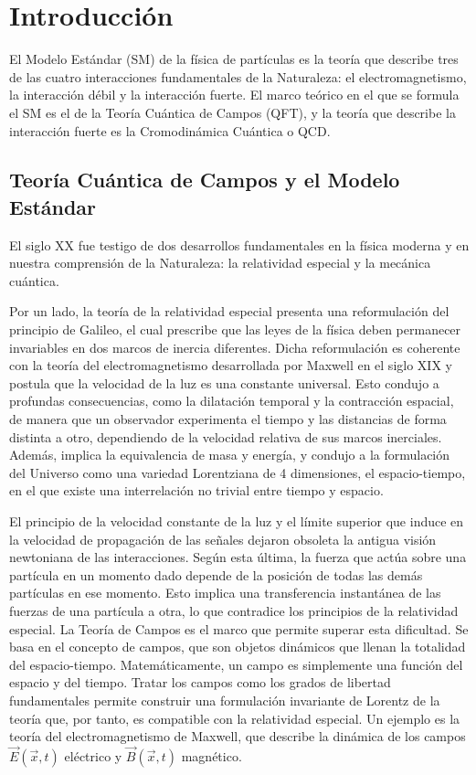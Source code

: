\chapter*{Introducci\'on}


El Modelo Estándar (SM) de la física de partículas es la teoría que describe tres de las cuatro interacciones fundamentales de la Naturaleza: el electromagnetismo, la interacción débil y la interacción fuerte. El marco teórico en el que se formula el SM es el de la Teoría Cuántica de Campos (QFT), y la teoría que describe la interacción fuerte es la Cromodinámica Cuántica o QCD.

\section*{Teoría Cuántica de Campos y el Modelo Estándar}

El siglo XX fue testigo de dos desarrollos fundamentales en la física moderna y en nuestra comprensión de la Naturaleza: la relatividad especial y la mecánica cuántica. 

Por un lado, la teoría de la relatividad especial presenta una reformulación del principio de Galileo, el cual prescribe que las leyes de la física deben permanecer invariables en dos marcos de inercia diferentes. Dicha reformulación es coherente con la teoría del electromagnetismo desarrollada por Maxwell en el siglo XIX y postula que la velocidad de la luz es una constante universal. Esto condujo a profundas consecuencias, como la dilatación temporal y la contracción espacial, de manera que un observador experimenta el tiempo y las distancias de forma distinta a otro, dependiendo de la velocidad relativa de sus marcos inerciales. Además, implica la equivalencia de masa y energía, y condujo a la formulación del Universo como una variedad Lorentziana de 4 dimensiones, el espacio-tiempo, en el que existe una interrelación no trivial entre tiempo y espacio.

El principio de la velocidad constante de la luz y el límite superior que induce en la velocidad de propagación de las señales dejaron obsoleta la antigua visión newtoniana de las interacciones. Según esta última, la fuerza que actúa sobre una partícula en un momento dado depende de la posición de todas las demás partículas en ese momento. Esto implica una transferencia instantánea de las fuerzas de una partícula a otra, lo que contradice los principios de la relatividad especial. La Teoría de Campos es el marco que permite superar esta dificultad. Se basa en el concepto de campos, que son objetos dinámicos que llenan la totalidad del espacio-tiempo. Matemáticamente, un campo es simplemente una función del espacio y del tiempo. Tratar los campos como los grados de libertad fundamentales permite construir una formulación invariante de Lorentz de la teoría que, por tanto, es compatible con la relatividad especial. Un ejemplo es la teoría del electromagnetismo de Maxwell, que describe la dinámica de los campos $\vec{E}(\vec{x},t)$ eléctrico y $\vec{B}(\vec{x},t)$ magnético.

